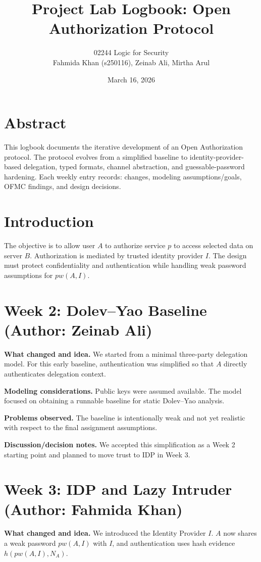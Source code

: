 \documentclass[11pt,a4paper]{article}
\title{Project Lab Logbook: Open Authorization Protocol}
\author{02244 Logic for Security\\
Fahmida Khan (s250116), Zeinab Ali, Mirtha Arul}
\date{March 16, 2026}
\begin{document}
\maketitle

\section*{Abstract}
This logbook documents the iterative development of an Open Authorization protocol.
The protocol evolves from a simplified baseline to identity-provider-based delegation, typed formats, channel abstraction, and guessable-password hardening.
Each weekly entry records: changes, modeling assumptions/goals, OFMC findings, and design decisions.

\section{Introduction}
The objective is to allow user $A$ to authorize service $p$ to access selected data on server $B$.
Authorization is mediated by trusted identity provider $I$.
The design must protect confidentiality and authentication while handling weak password assumptions for $pw(A,I)$.

\section{Week 2: Dolev--Yao Baseline (Author: Zeinab Ali)}
\textbf{What changed and idea.}
We started from a minimal three-party delegation model.
For this early baseline, authentication was simplified so that $A$ directly authenticates delegation context.

\textbf{Modeling considerations.}
Public keys were assumed available.
The model focused on obtaining a runnable baseline for static Dolev--Yao analysis.

\textbf{Problems observed.}
The baseline is intentionally weak and not yet realistic with respect to the final assignment assumptions.

\textbf{Discussion/decision notes.}
We accepted this simplification as a Week 2 starting point and planned to move trust to IDP in Week 3.

\section{Week 3: IDP and Lazy Intruder (Author: Fahmida Khan)}
\textbf{What changed and idea.}
We introduced the Identity Provider $I$.
$A$ now shares a weak password $pw(A,I)$ with $I$, and authentication uses hash evidence $h(pw(A,I),N_A)$.
\end{document}
